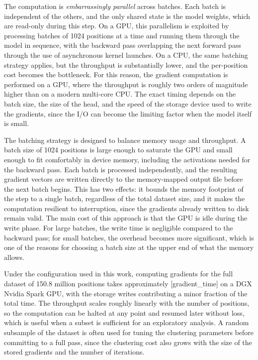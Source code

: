 The computation is \emph{embarrassingly parallel} across batches. Each batch is independent of the others, and the only shared state is the model weights, which are read-only during this step. On a GPU, this parallelism is exploited by processing batches of 1024 positions at a time and running them through the model in sequence, with the backward pass overlapping the next forward pass through the use of asynchronous kernel launches. On a CPU, the same batching strategy applies, but the throughput is substantially lower, and the per-position cost becomes the bottleneck. For this reason, the gradient computation is performed on a GPU, where the throughput is roughly two orders of magnitude higher than on a modern multi-core CPU. The exact timing depends on the batch size, the size of the head, and the speed of the storage device used to write the gradients, since the I/O can become the limiting factor when the model itself is small.

The batching strategy is designed to balance memory usage and throughput. A batch size of 1024 positions is large enough to saturate the GPU and small enough to fit comfortably in device memory, including the activations needed for the backward pass. Each batch is processed independently, and the resulting gradient vectors are written directly to the memory-mapped output file before the next batch begins. This has two effects: it bounds the memory footprint of the step to a single batch, regardless of the total dataset size, and it makes the computation resilient to interruption, since the gradients already written to disk remain valid. The main cost of this approach is that the GPU is idle during the write phase. For large batches, the write time is negligible compared to the backward pass; for small batches, the overhead becomes more significant, which is one of the reasons for choosing a batch size at the upper end of what the memory allows.

Under the configuration used in this work, computing gradients for the full dataset of 150.8 million positions takes approximately [gradient\_time] on a DGX Nvidia Spark GPU, with the storage writes contributing a minor fraction of the total time. The throughput scales roughly linearly with the number of positions, so the computation can be halted at any point and resumed later without loss, which is useful when a subset is sufficient for an exploratory analysis. A random subsample of the dataset is often used for tuning the clustering parameters before committing to a full pass, since the clustering cost also grows with the size of the stored gradients and the number of iterations.



